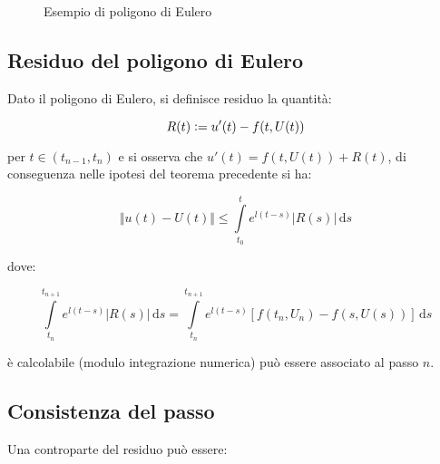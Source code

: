 \documentclass[hidelinks, 10pt]{report}
\begin{document}
\begin{figure}[H]
\begin{center}

\caption{Esempio di poligono di Eulero}
\end{center}
\end{figure}

\subsection{Residuo del poligono di Eulero}
Dato il poligono di Eulero, si definisce residuo la quantit\`a:

\[ R(t) \vcentcolon= u'(t) - f(t, U(t)) \]

per $ t \in (t_{n - 1}, t_{n}) $ e si osserva che $ u'(t) = f(t, U(t)) + R(t) $, di conseguenza nelle ipotesi del teorema precedente si ha:

\[ \Vert u(t) - U(t) \Vert \leq \int\limits_{t_{0}}^{t} e^{l(t - s)} \vert R(s) \vert \, \mathrm{d}s \] 

dove:

\[
\int\limits_{t_{n}}^{t_{n + 1}} e^{l(t - s)} \vert R(s) \vert \, \mathrm{d}s = \int\limits_{t_{n}}^{t_{n + 1}} e^{l(t - s)} [f(t_{n}, U_{n}) - f(s, U(s))] \, \mathrm{d}s
\]

\`e calcolabile (modulo integrazione numerica) pu\`o essere associato al passo $ n $.	%

\subsection{Consistenza del passo}
Una controparte del residuo pu\`o essere:
\end{document}
